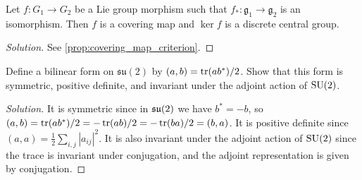 \documentclass{report}
\begin{document}
\begin{exercise}[Exercise 2.3]
    Let $f:G_1 \to G_2$ be a Lie group morphism such that $f_*: \mathfrak g_1 \to \mathfrak g_2$ is an isomorphism.
    Then $f$ is a covering map and $\ker f$ is a discrete central group.
\end{exercise}
\begin{proof}[Solution]
    See \cref{prop:covering_map_criterion}.
\end{proof}
\begin{exercise}[Exercise 2.7]
Define a bilinear form on $\mathfrak{su}(2)$ by $(a, b) = \operatorname{tr}(ab^*)/2$. 
Show that this form is symmetric, positive deﬁnite, and invariant under the adjoint action of
$\operatorname{{\mathrm{SU}}}(2)$.
\end{exercise}
\begin{proof}[Solution]
    It is symmetric since in $\operatorname{{\mathfrak{su}}}(2)$ we have $b^* = -b$, so $(a,b) = \operatorname{tr}(ab^*)/2 = -\operatorname{tr}(ab)/2 = 
    -\operatorname{tr}(ba)/2 = (b,a)$.
    It is positive definite since $(a,a) = \frac{1}{2} \sum_{i,j} |a_{ij}|^2$.
    It is also invariant under the adjoint action of $\operatorname{{\mathrm{SU}}}(2)$ since the trace is invariant under conjugation, and the adjoint representation is given by conjugation.
\end{proof}
\end{document}
